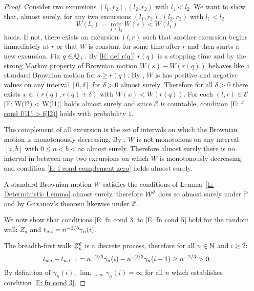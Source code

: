 \begin{proof}
	Consider two excursions $(l_1, r_2), (l_2, r_2)$ with $l_1 < l_2$.
	We want to show that, almost surely, for any two excursions $(l_1, r_2), (l_2, r_2)$ with $l_1 < l_2$
	\begin{equation} \label{E: W(l2) < W(l1)}
		W(l_2) = \min_{s \leq l_2} W(s) < W(l_1)
	\end{equation} 
	holds.
	If not, there exists an excursion $(l,r)$ such that another excursion begins immediately at $r$
	or that $W$ is constant for some time after $r$ and then starts a new excursion.
	Fix $q \in \mathbb{Q}_+$. 
	By \eqref{E: def r(q)} $r(q)$ is a stopping time and by the strong Markov property of Brownian motion
	$W(s) - W(r(q))$ behaves like a standard Brownian motion for $s \geq r(q)$.
	By \cite[Theorem 2.8, p.38]{Morters.2010},
	$W$ is has positive and negative values on any interval $[0,\delta]$ for $\delta > 0$ almost surely.
	Therefore for all $\delta > 0$ there exists $x \in (r(q), r(q) + \delta)$ with $W(x) < W(r(q))$.
	For each $(l,r) \in \mathcal{E}$ \eqref{E: W(l2) < W(l1)} holds almost surely
	and since $\mathcal{E}$ is countable,
	condition \eqref{E: f cond f(l1) > f(l2)} holds with probability $1$.
	
	The complement of all excursion is the set of intervals
	on which the Brownian motion is monotonously decreasing.
	By \cite[Theorem 1.22, p.18]{Morters.2010}, 
	$W$ is not monotonous on any interval $[a,b]$ with $0 \leq a < b < \infty$ almost surely.
	Therefore almost surely there is no interval in between any two excursions on which $W$ is monotonously decreasing
	and condition \eqref{E: f cond complement zero} holds almost surely.
	
	A standard Brownian motion $W$ satisfies the conditions of Lemma~\ref{L: Deterministic Lemma} almost surely,
	therefore $\mathcal{W}^{\theta}$ does so almost surely under $\tilde{\mathbb{P}}$
	and by Girsanov's theorem likewise under $\mathbb{P}$.

	
	We now show that conditions 
	\eqref{E: fn cond 3} to \eqref{E: fn cond 5}
	hold for the random walk $Z_n$ and $t_{n,i} = n^{-2 / 3} \gamma_n(i)$.
	
	The breadth-first walk $Z_n^{\theta}$ is a discrete process, therefore for all $n \in \mathbb{N}$ and $i \geq 2$:
	\begin{equation}
		t_{n, i} - t_{n, i-1} = n^{-2 / 3}\gamma_n(i) - n^{-2 / 3}\gamma_n(i-1) \geq n^{-2 / 3} > 0.
	\end{equation}
	By definition of $\gamma_n(i)$,
	$\lim_{i \rightarrow \infty} \gamma_n(i) = \infty$ for all $n$
	which establishes condition \eqref{E: fn cond 3}.
	

\end{proof}
